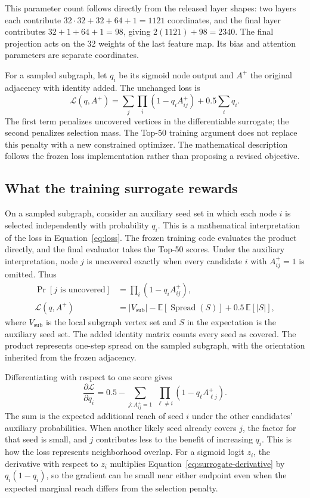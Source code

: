 This parameter count follows directly from the released layer shapes: two layers each contribute $32\cdot32+32+64+1=1121$ coordinates, and the final layer contributes $32+1+64+1=98$, giving $2(1121)+98=2340$. The final projection acts on the 32 weights of the last feature map. Its bias and attention parameters are separate coordinates.

For a sampled subgraph, let $q_i$ be its sigmoid node output and $A^+$ the original adjacency with identity added. The unchanged loss is
\begin{equation}
 \mathcal{L}(q,A^+)=\sum_j\prod_i(1-q_i A^+_{ij})+
 0.5\sum_i q_i.\label{eq:loss}
\end{equation}
The first term penalizes uncovered vertices in the differentiable surrogate; the second penalizes selection mass. The Top-50 training argument does not replace this penalty with a new constrained optimizer. The mathematical description follows the frozen loss implementation rather than proposing a revised objective.

\subsection{What the training surrogate rewards}
On a sampled subgraph, consider an auxiliary seed set in which each node $i$ is selected independently with probability $q_i$. This is a mathematical interpretation of the loss in Equation~\eqref{eq:loss}. The frozen training code evaluates the product directly, and the final evaluator takes the Top-50 scores. Under the auxiliary interpretation, node $j$ is uncovered exactly when every candidate $i$ with $A^+_{ij}=1$ is omitted. Thus
\begin{align}
 \Pr[j\text{ is uncovered}]
 &=\prod_i(1-q_iA^+_{ij}),\\
 \mathcal L(q,A^+)
 &=|V_{\mathrm{sub}}|-\mathbb E[\operatorname{Spread}(S)]
    +0.5\,\mathbb E[|S|],
 \label{eq:expected-surrogate}
\end{align}
where $V_{\mathrm{sub}}$ is the local subgraph vertex set and $S$ in the expectation is the auxiliary seed set. The added identity matrix counts every seed as covered. The product represents one-step spread on the sampled subgraph, with the orientation inherited from the frozen adjacency.

Differentiating with respect to one score gives
\begin{equation}
 \frac{\partial \mathcal L}{\partial q_i}
 =0.5-
   \sum_{j:A^+_{ij}=1}\;\prod_{\ell\ne i}(1-q_\ell A^+_{\ell j}).
 \label{eq:surrogate-derivative}
\end{equation}
The sum is the expected additional reach of seed $i$ under the other candidates' auxiliary probabilities. When another likely seed already covers $j$, the factor for that seed is small, and $j$ contributes less to the benefit of increasing $q_i$. This is how the loss represents neighborhood overlap. For a sigmoid logit $z_i$, the derivative with respect to $z_i$ multiplies Equation~\eqref{eq:surrogate-derivative} by $q_i(1-q_i)$, so the gradient can be small near either endpoint even when the expected marginal reach differs from the selection penalty.

